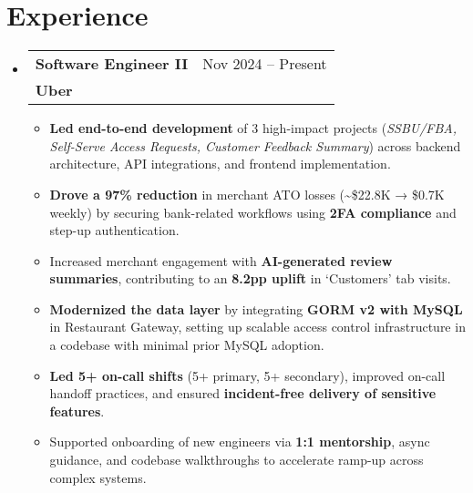 \documentclass[letterpaper,10.8pt]{article}
\makeatletter
\newcommand{\resumeSubheading}[4]{
  \vspace{-1pt}\item
    \begin{tabular*}{0.97\textwidth}{l@{\extracolsep{\fill}}r}
      \textbf{#1} & #2 \\
      \textbf{#3} & \textit{\small #4} \\
    \end{tabular*}\vspace{-5pt}
}
\newcommand{\resumeSubHeadingListStart}{\begin{itemize}[leftmargin=*]}
\newcommand{\resumeSubHeadingListEnd}{\end{itemize}}
\makeatother
\begin{document}
\section{Experience}
\resumeSubHeadingListStart
  \resumeSubheading
    {Software Engineer II}{Nov 2024 – Present}
    {Uber}{}
    \begin{itemize}[itemsep=0pt]
        \item \textbf{Led end-to-end development} of 3 high-impact projects (\textit{SSBU/FBA, Self-Serve Access Requests, Customer Feedback Summary}) across backend architecture, API integrations, and frontend implementation.
        \item \textbf{Drove a 97\% reduction} in merchant ATO losses (\textasciitilde\$22.8K → \$0.7K weekly) by securing bank-related workflows using \textbf{2FA compliance} and step-up authentication.
        \item Increased merchant engagement with \textbf{AI-generated review summaries}, contributing to an \textbf{8.2pp uplift} in ‘Customers’ tab visits.
        \item \textbf{Modernized the data layer} by integrating \textbf{GORM v2 with MySQL} in Restaurant Gateway, setting up scalable access control infrastructure in a codebase with minimal prior MySQL adoption.
        \item \textbf{Led 5+ on-call shifts} (5+ primary, 5+ secondary), improved on-call handoff practices, and ensured \textbf{incident-free delivery of sensitive features}.
        \item Supported onboarding of new engineers via \textbf{1:1 mentorship}, async guidance, and codebase walkthroughs to accelerate ramp-up across complex systems.
    \end{itemize}
\resumeSubHeadingListEnd
\end{document}
